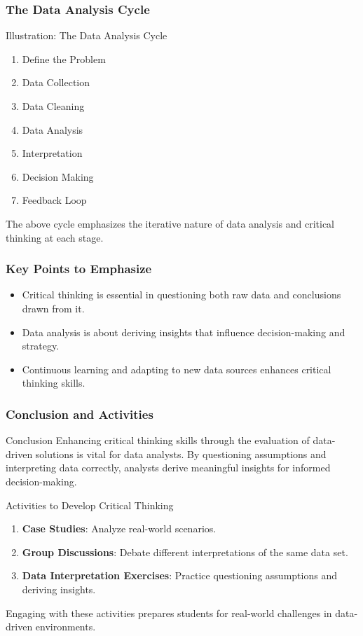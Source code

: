 \documentclass[aspectratio=169]{beamer}
\begin{document}
\begin{frame}[fragile]
    \frametitle{The Data Analysis Cycle}
    \begin{block}{Illustration: The Data Analysis Cycle}
        \begin{enumerate}
            \item Define the Problem
            \item Data Collection
            \item Data Cleaning
            \item Data Analysis
            \item Interpretation
            \item Decision Making
            \item Feedback Loop
        \end{enumerate}
        The above cycle emphasizes the iterative nature of data analysis and critical thinking at each stage.
    \end{block}
\end{frame}

\begin{frame}[fragile]
    \frametitle{Key Points to Emphasize}
    \begin{itemize}
        \item Critical thinking is essential in questioning both raw data and conclusions drawn from it.
        \item Data analysis is about deriving insights that influence decision-making and strategy.
        \item Continuous learning and adapting to new data sources enhances critical thinking skills.
    \end{itemize}
\end{frame}

\begin{frame}[fragile]
    \frametitle{Conclusion and Activities}
    \begin{block}{Conclusion}
        Enhancing critical thinking skills through the evaluation of data-driven solutions is vital for data analysts. 
        By questioning assumptions and interpreting data correctly, analysts derive meaningful insights for informed decision-making.
    \end{block}

    \begin{block}{Activities to Develop Critical Thinking}
        \begin{enumerate}
            \item \textbf{Case Studies}: Analyze real-world scenarios.
            \item \textbf{Group Discussions}: Debate different interpretations of the same data set.
            \item \textbf{Data Interpretation Exercises}: Practice questioning assumptions and deriving insights.
        \end{enumerate}
        Engaging with these activities prepares students for real-world challenges in data-driven environments.
    \end{block}
\end{frame}
\end{document}
